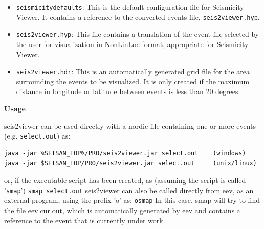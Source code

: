 \begin{enumerate}
\begin{itemize}
\item \texttt{seismicitydefaults}: This is the default configuration file for Seismicity Viewer. It contains a reference to the converted events file, \texttt{seis2viewer.hyp}.
\item \texttt{seis2viewer.hyp}: This file contains a translation of the event file selected by the user for visualization in NonLinLoc format, appropriate for Seismicity Viewer.
\item \texttt{seis2viewer.hdr}: This is an automatically generated grid file for the area surrounding the events to be visualized. It is only created if the maximum distance in longitude or latitude between events is less than 20 degrees.
\end{itemize}

\end{enumerate}

\textbf{Usage}

seis2viewer can be used directly with a nordic file containing one or more events (e.g. \texttt{select.out}) as:

\begin{verbatim}
java -jar %SEISAN_TOP%/PRO/seis2viewer.jar select.out    (windows)
java -jar $SEISAN_TOP/PRO/seis2viewer.jar select.out     (unix/linux)
\end{verbatim}

or, if the executable script has been created, as (assuming the script is called '\texttt{smap}')\newline
\texttt{smap select.out}\newline
seis2viewer can also be called directly from eev, as an external program, using the prefix 'o' as:\newline
\texttt{osmap}\newline
In this case, smap will try to find the file eev.cur.out, which is automatically generated by eev and contains a reference to the event that is currently under work.


